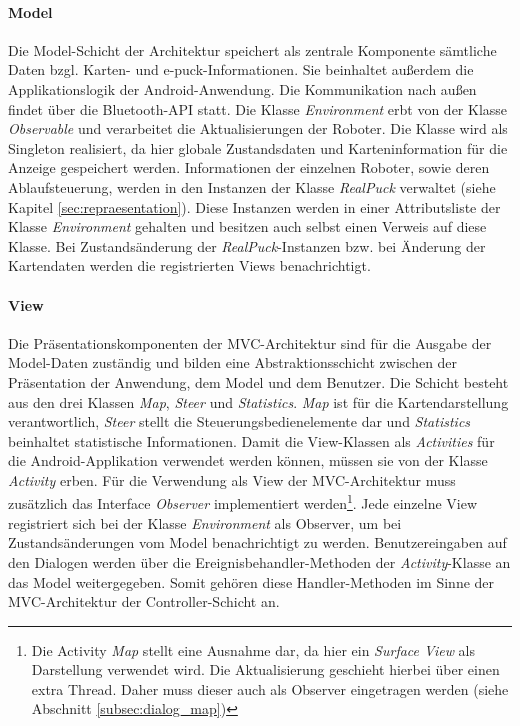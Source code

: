 \documentclass[10pt,a4paper]{article}
\begin{document}
			\paragraph*{Model}
  				Die Model-Schicht der Architektur speichert als zentrale Komponente sämtliche Daten bzgl. Karten- und e-puck-Informationen. 
  				Sie beinhaltet außerdem die Applikationslogik der Android-Anwendung. Die Kommunikation nach außen findet über die
  				Bluetooth-API statt. Die Klasse \textit{Environment} erbt von der Klasse \textit{Observable} und verarbeitet
  				die Aktualisierungen der Roboter. Die Klasse wird als Singleton realisiert, da hier globale Zustandsdaten und Karteninformation
  				für die Anzeige gespeichert werden. Informationen der einzelnen Roboter, sowie deren Ablaufsteuerung, werden in den Instanzen
  				der Klasse \textit{RealPuck} verwaltet (siehe Kapitel \ref{sec:repraesentation}). Diese Instanzen werden in einer Attributsliste der Klasse
  				\textit{Environment} gehalten und besitzen auch selbst einen Verweis auf diese Klasse. Bei Zustandsänderung der \textit{RealPuck}-Instanzen
  				bzw. bei Änderung der Kartendaten werden die registrierten Views benachrichtigt.
  			\paragraph*{View}
  				Die Präsentationskomponenten der MVC-Architektur sind für die Ausgabe der Model-Daten zuständig und bilden eine
  				Abstraktionsschicht zwischen der Präsentation der Anwendung, dem Model und dem Benutzer. Die Schicht besteht aus den drei
  				Klassen	\textit{Map}, \textit{Steer} und \textit{Statistics}. \textit{Map} ist für die Kartendarstellung
  				verantwortlich, \textit{Steer} stellt die Steuerungsbedienelemente dar und \textit{Statistics} beinhaltet statistische
  				Informationen.  Damit die View-Klassen als \textit{Activities} für die Android-Applikation verwendet werden können, müssen sie
  				von der Klasse \textit{Activity} erben. Für die Verwendung als View der MVC-Architektur muss zusätzlich das Interface
  				\textit{Observer} implementiert werden\footnote{Die Activity \textit{Map} stellt eine Ausnahme dar, da hier ein \textit{Surface View} als
  				Darstellung verwendet wird. Die Aktualisierung geschieht hierbei über einen extra Thread. Daher muss dieser auch als Observer eingetragen
  				werden (siehe Abschnitt \ref{subsec:dialog_map})}. Jede einzelne View registriert sich bei der Klasse \textit{Environment} als Observer,
  				um bei Zustandsänderungen vom Model benachrichtigt zu werden. Benutzereingaben auf den Dialogen werden über
  				die Ereignisbehandler-Methoden der \textit{Activity}-Klasse an das Model weitergegeben. Somit gehören diese Handler-Methoden
  				im Sinne der MVC-Architektur der Controller-Schicht an.
\end{document}
